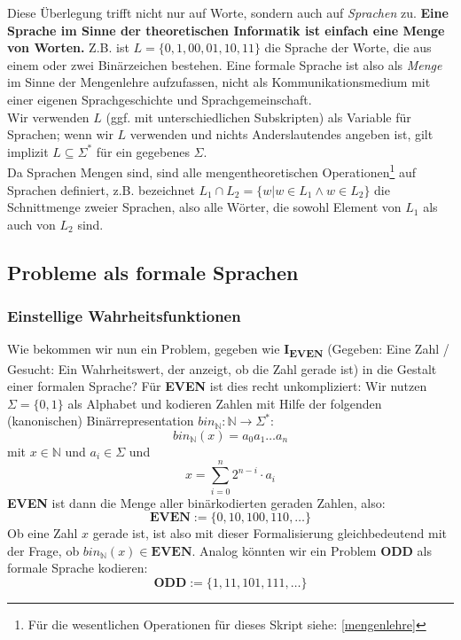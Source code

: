 Diese Überlegung trifft nicht nur auf Worte, sondern auch auf \emph{Sprachen} zu.
\textbf{Eine Sprache im Sinne der theoretischen Informatik ist einfach eine Menge von Worten.}
Z.B. ist $L = \{0, 1, 00, 01, 10, 11 \}$ die Sprache der Worte,
die aus einem oder zwei Binärzeichen bestehen.
Eine formale Sprache ist also als \emph{Menge} im Sinne der Mengenlehre aufzufassen, 
nicht als Kommunikationsmedium mit einer eigenen Sprachgeschichte und Sprachgemeinschaft.\\

\noindent
Wir verwenden $L$ (ggf. mit unterschiedlichen Subskripten) als Variable für Sprachen;
wenn wir $L$ verwenden und nichts Anderslautendes angeben ist,
gilt implizit $L \subseteq \Sigma^*$ für ein gegebenes $\Sigma$.\\

\noindent
Da Sprachen Mengen sind,
sind alle mengentheoretischen Operationen\footnote{
    Für die wesentlichen Operationen für dieses Skript siehe: \autoref{mengenlehre}}
auf Sprachen definiert,
z.B. bezeichnet $L_1 \cap L_2 = \{w | w \in L_1 \wedge w \in L_2\}$
die Schnittmenge zweier Sprachen, also alle Wörter,
die sowohl Element von $L_1$ als auch von $L_2$ sind.



\subsection{Probleme als formale Sprachen}\label{subsec:problemeAlsFormaleSprachen}

\subsubsection{Einstellige Wahrheitsfunktionen}
Wie bekommen wir nun ein Problem, gegeben wie \textbf{I\textsubscript{EVEN}} 
(Gegeben: Eine Zahl / Gesucht: Ein Wahrheitswert, der anzeigt, ob die Zahl gerade ist)
in die Gestalt einer formalen Sprache?
Für \textbf{EVEN} ist dies recht unkompliziert:
Wir nutzen $\Sigma = \{0,1\}$ als Alphabet
und kodieren Zahlen mit Hilfe der folgenden (kanonischen) Binärrepresentation
$bin_{\mathbb{N}}: \mathbb{N} \rightarrow \Sigma^*$:
\[
    bin_{\mathbb{N}}(x) = a_{0}a_{1} \ldots a_{n}
\]
mit $x \in \mathbb{N}$ und $a_i \in \Sigma$ und 
\[
    x = \sum_{i=0}^n 2^{n-i} \cdot a_i
\]
\textbf{EVEN} ist dann die Menge aller binärkodierten geraden Zahlen, also:
\[
    \mathbf{EVEN} := \{0, 10, 100, 110, \ldots\}
\]
Ob eine Zahl $x$ gerade ist, ist also mit dieser Formalisierung gleichbedeutend mit der Frage,
ob $bin_{\mathbb{N}}(x) \in \mathbf{EVEN}$.
Analog könnten wir ein Problem \textbf{ODD} als formale Sprache kodieren:
\[
    \mathbf{ODD} := \{1, 11, 101, 111, \ldots \}
\]

